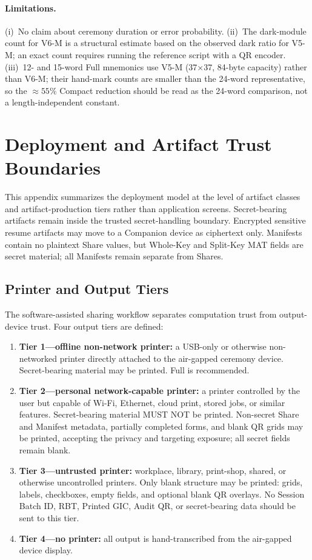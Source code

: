 \documentclass[11pt]{article}
\begin{document}
\paragraph{Limitations.} (i)~No claim about ceremony duration or error probability. (ii)~The dark-module count for V6-M is a structural estimate based on the observed dark ratio for V5-M; an exact count requires running the reference script with a QR encoder. (iii)~12- and 15-word Full mnemonics use V5-M (37$\times$37, 84-byte capacity) rather than V6-M; their hand-mark counts are smaller than the 24-word representative, so the ${\approx}55\%$ Compact reduction should be read as the 24-word comparison, not a length-independent constant.

\section{Deployment and Artifact Trust Boundaries}
\label{app:trust-boundaries}

This appendix summarizes the deployment model at the level of artifact classes and artifact-production tiers rather than application screens. Secret-bearing artifacts remain inside the trusted secret-handling boundary. Encrypted sensitive resume artifacts may move to a Companion device as ciphertext only. Manifests contain no plaintext Share values, but Whole-Key and Split-Key MAT fields are secret material; all Manifests remain separate from Shares.

\subsection{Printer and Output Tiers}

The software-assisted sharing workflow separates computation trust from output-device trust. Four output tiers are defined:

\begin{enumerate}[noitemsep]
    \item \textbf{Tier 1---offline non-network printer:} a USB-only or otherwise non-networked printer directly attached to the air-gapped ceremony device. Secret-bearing material may be printed. Full is recommended.
    \item \textbf{Tier 2---personal network-capable printer:} a printer controlled by the user but capable of Wi-Fi, Ethernet, cloud print, stored jobs, or similar features. Secret-bearing material MUST NOT be printed. Non-secret Share and Manifest metadata, partially completed forms, and blank QR grids may be printed, accepting the privacy and targeting exposure; all secret fields remain blank.
    \item \textbf{Tier 3---untrusted printer:} workplace, library, print-shop, shared, or otherwise uncontrolled printers. Only blank structure may be printed: grids, labels, checkboxes, empty fields, and optional blank QR overlays. No Session Batch ID, RBT, Printed GIC, Audit QR, or secret-bearing data should be sent to this tier.
    \item \textbf{Tier 4---no printer:} all output is hand-transcribed from the air-gapped device display.
\end{enumerate}
\end{document}

